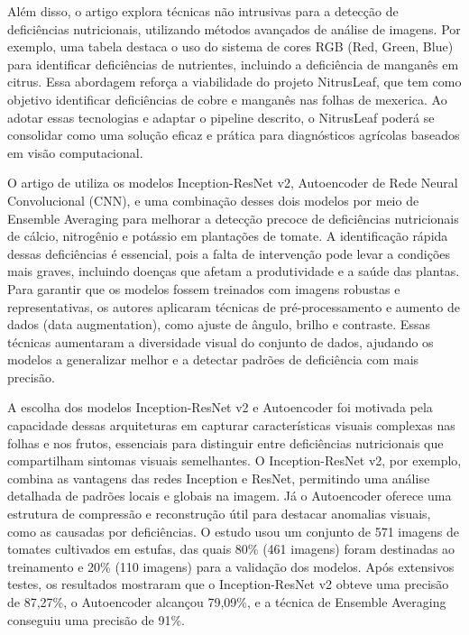     Além disso, o artigo explora técnicas não intrusivas para a detecção de deficiências nutricionais, utilizando métodos avançados de análise de imagens. Por exemplo, uma tabela destaca o uso do sistema de cores RGB (Red, Green, Blue) para identificar deficiências de nutrientes, incluindo a deficiência de manganês em citrus. Essa abordagem reforça a viabilidade do projeto NitrusLeaf, que tem como objetivo identificar deficiências de cobre e manganês nas folhas de mexerica. Ao adotar essas tecnologias e adaptar o pipeline descrito, o NitrusLeaf poderá se consolidar como uma solução eficaz e prática para diagnósticos agrícolas baseados em visão computacional.



O artigo de \textcite{EstadoArte3} utiliza os modelos Inception-ResNet v2, Autoencoder de Rede Neural Convolucional (CNN), e uma combinação desses dois modelos por meio de Ensemble Averaging para melhorar a detecção precoce de deficiências nutricionais de cálcio, nitrogênio e potássio em plantações de tomate. A identificação rápida dessas deficiências é essencial, pois a falta de intervenção pode levar a condições mais graves, incluindo doenças que afetam a produtividade e a saúde das plantas. Para garantir que os modelos fossem treinados com imagens robustas e representativas, os autores aplicaram técnicas de pré-processamento e aumento de dados (data augmentation), como ajuste de ângulo, brilho e contraste. Essas técnicas aumentaram a diversidade visual do conjunto de dados, ajudando os modelos a generalizar melhor e a detectar padrões de deficiência com mais precisão.

A escolha dos modelos Inception-ResNet v2 e Autoencoder foi motivada pela capacidade dessas arquiteturas em capturar características visuais complexas nas folhas e nos frutos, essenciais para distinguir entre deficiências nutricionais que compartilham sintomas visuais semelhantes. O Inception-ResNet v2, por exemplo, combina as vantagens das redes Inception e ResNet, permitindo uma análise detalhada de padrões locais e globais na imagem. Já o Autoencoder oferece uma estrutura de compressão e reconstrução útil para destacar anomalias visuais, como as causadas por deficiências. O estudo usou um conjunto de 571 imagens de tomates cultivados em estufas, das quais 80\% (461 imagens) foram destinadas ao treinamento e 20\% (110 imagens) para a validação dos modelos. Após extensivos testes, os resultados mostraram que o Inception-ResNet v2 obteve uma precisão de 87,27\%, o Autoencoder alcançou 79,09\%, e a técnica de Ensemble Averaging conseguiu uma precisão de 91\%.

